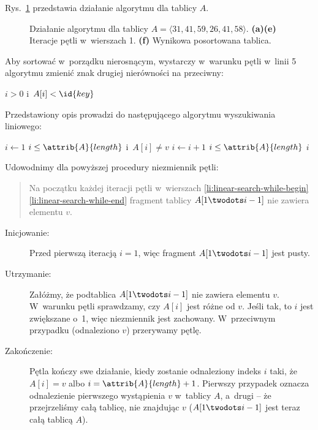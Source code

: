 
\exercise %
Rys.\ \ref{fig:2.1-1} przedstawia działanie algorytmu  dla tablicy $A$.
\begin{figure}[!ht]
	\centering 
	\caption{Działanie algorytmu  dla tablicy $A=\langle31,41,59,26,41,58\rangle$.
{\sffamily\bfseries(a)\nbendash(e)} Iteracje pętli  w~wierszach 1.
{\sffamily\bfseries(f)} Wynikowa posortowana tablica.} \label{fig:2.1-1}
\end{figure}

\exercise %
Aby sortować w~porządku nierosnącym, wystarczy w~warunku pętli  w~linii 5 algorytmu  zmienić znak drugiej nierówności na przeciwny:
\begin{codebox}
\setcounter{codelinenumber}{4}
\li	\While $i>0$ i~$A[i]<\id{key}$
\end{codebox}

\exercise %
Przedstawiony opis prowadzi do następującego algorytmu wyszukiwania liniowego:
\begin{codebox}
\li	$i\gets1$
\li	\While $i\le\attrib{A}{length}$ i~$A[i]\ne v$ \label{li:linear-search-while-begin}
\li		\Do $i\gets i+1$
		\End \label{li:linear-search-while-end}
\li	\If $i\le\attrib{A}{length}$
\li		\Then \Return $i$
		\End
\li	\Return {}
\end{codebox}

Udowodnimy dla powyższej procedury niezmiennik pętli:
\begin{quote}
Na początku każdej iteracji pętli  w~wierszach \ref{li:linear-search-while-begin}\nbendash\ref{li:linear-search-while-end} fragment tablicy $A[1\twodots i-1]$ nie zawiera elementu $v$.
\end{quote}
\begin{description}
	\item[Inicjowanie:] Przed pierwszą iteracją $i=1$, więc fragment $A[1\twodots i-1]$ jest pusty.
	\item[Utrzymanie:] Załóżmy, że podtablica $A[1\twodots i-1]$ nie zawiera elementu $v$.
W~warunku pętli  sprawdzamy, czy $A[i]$ jest różne od $v$.
Jeśli tak, to $i$ jest zwiększane o~1, więc niezmiennik jest zachowany.
W~przeciwnym przypadku (odnaleziono $v$) przerywamy pętlę.
	\item[Zakończenie:] Pętla kończy swe działanie, kiedy zostanie odnaleziony indeks $i$ taki, że $A[i]=v$ albo $i=\attrib{A}{length}+1$.
Pierwszy przypadek oznacza odnalezienie pierwszego wystąpienia $v$ w~tablicy $A$, a~drugi -- że przejrzeliśmy całą tablicę, nie znajdując $v$ ($A[1\twodots i-1]$ jest teraz całą tablicą $A$).
\end{description}

